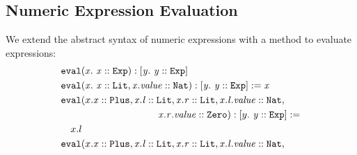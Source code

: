 \subsection{Numeric Expression Evaluation}
We extend the abstract syntax of numeric expressions
with a method to evaluate expressions:
%
\begin{align*}
&\mDecl{\texttt{eval}}{x}{\instOf{x}{\texttt{Exp}}}{\type{y}{\instOf{y}{\texttt{Exp}}}}\\
&\mImpl{\texttt{eval}}
       {x}
       {\instOf{x}{\texttt{Lit}}, \instOf{x.value}{\texttt{Nat}}}
       {\type{y}{\instOf{y}{\texttt{Exp}}}}
       {x}\\
&\texttt{eval}(x. \instOf{x}{\texttt{Plus}},
                  \instOf{x.l}{\texttt{Lit}},
                  \instOf{x.r}{\texttt{Lit}},
                  \instOf{x.l.value}{\texttt{Nat}},\\
&\qquad\qquad\qquad\qquad\qquad
                  \instOf{x.r.value}{\texttt{Zero}} )
    : \type{y}{\instOf{y}{\texttt{Exp}}} := \\
&\quad x.l\\
&\texttt{eval}(x. \instOf{x}{\texttt{Plus}},
                  \instOf{x.l}{\texttt{Lit}},
                  \instOf{x.r}{\texttt{Lit}},
                  \instOf{x.l.value}{\texttt{Nat}},\\

\end{align*}
